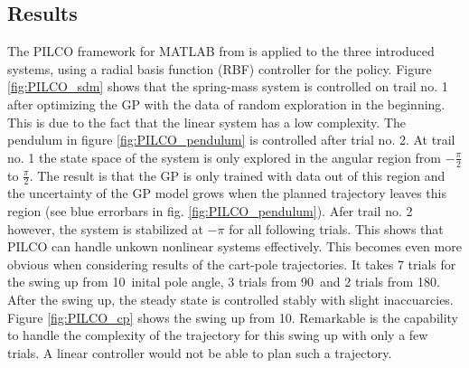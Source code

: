 \documentclass[letterpaper, 10 pt, conference]{ieeeconf}  %
\begin{document}
\subsection{Results}
The PILCO framework for MATLAB from \cite{PILCO_web} is applied to the three introduced systems, %
using a radial basis function (RBF) controller for the policy. 
Figure \ref{fig:PILCO_sdm} shows that the spring-mass system is controlled on trail no. 1 after optimizing the GP with the data of random exploration in the beginning. This is due to the fact that the linear system has a low complexity. 
The pendulum in figure \ref{fig:PILCO_pendulum} is controlled after trial no. 2. At trail no. 1 the state space of the system is only explored in the angular region from $-\frac{\pi}{2}$ to $\frac{\pi}{2}$. The result is that the GP is only trained with data out of this region and the uncertainty of the GP model grows when the planned trajectory leaves this region (see blue errorbars in fig. \ref{fig:PILCO_pendulum}). Afer trail no. 2 however, the system is stabilized at $-\pi$ for all following trials.
This shows that PILCO can handle unkown nonlinear systems effectively. This becomes even more obvious when considering results of the cart-pole trajectories. It takes 7 trials for the swing up from 10\textdegree \, inital pole angle, 3 trials from 90\textdegree \, and 2 trials from 180\textdegree . After the swing up, the steady state is controlled stably with slight inaccuarcies. Figure \ref{fig:PILCO_cp} shows the swing up from 10\textdegree. Remarkable is the capability to handle the complexity of the trajectory for this swing up with only a few trials.
A linear controller would not be able to plan such a trajectory.  %
\end{document}
